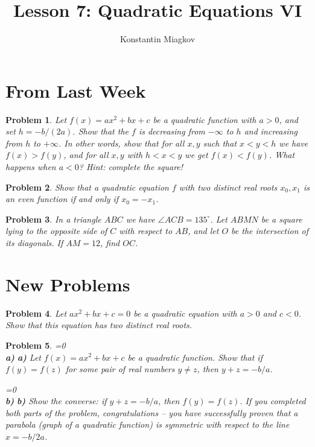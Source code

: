\documentclass[a4paper,12pt]{article}
\author{Konstantin Miagkov}
\title{Lesson 7: Quadratic Equations VI}
\theoremstyle{perfect}
\newtheorem{prb}{Problem}
\newcommand{\varline}{0}
\renewcommand\part[1]{
\ifnum\pdfstrcmp{\varline}{1}=0
    \vspace{.10in}\textbf{\\#1)}
  \else
    \textbf{#1)}
  \fi\renewcommand{\varline}{1}}
\begin{document}
 
\maketitle

\section{From Last Week}

\begin{prb}
Let $f(x) = ax^2+bx+c$ be a quadratic function with $a > 0$, and set $h = -b/(2a)$. Show that the $f$ is decreasing from $-\infty$ to $h$ and increasing from $h$ to $+\infty$. In other words, show that for all $x,y$ such that $x < y < h$ we have $f(x) > f(y)$, and for all $x,y$ with $h < x < y$ we get $f(x) < f(y)$. What happens when $a < 0$? \textit{Hint: complete the square!}
\end{prb}


\begin{prb}
Show that a quadratic equation $f$ with two distinct real roots $x_0, x_1$ is an even function if and only if $x_0 = -x_1$.
\end{prb}

\begin{prb}
In a triangle $ABC$ we have $\angle ACB = 135^\circ$. Let $ABMN$ be a square lying to the opposite side of $C$ with respect to $AB$, and let $O$ be the intersection of its diagonals. If $AM = 12$, find $OC$.
\end{prb}


\section{New Problems}

\begin{prb}
Let $ax^2+bx+c = 0$ be a quadratic equation with $a > 0$ and $c < 0$. Show that this equation has two distinct real roots.
\end{prb}

\begin{prb}
\part{a} Let $f(x) = ax^2+bx+c$ be a quadratic function. Show that if $f(y) = f(z)$ for some pair of real numbers $y \neq z$, then $y + z = -b/a$.
\part{b} Show the converse: if $y + z = -b/a$, then $f(y) = f(z)$. If you completed both parts of the problem, congratulations -- you have successfully proven that a parabola (graph of a quadratic function) is symmetric with respect to the line $x = -b/2a$.
\end{prb}
\end{document}
